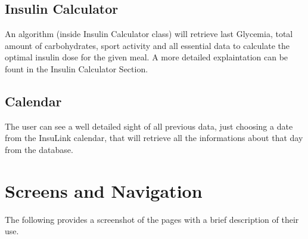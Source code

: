 \documentclass[12pt,hidelinks]{article}
\begin{document}
	\subsection{Insulin Calculator}
    An algorithm (inside Insulin Calculator class) will retrieve last Glycemia, total amount of carbohydrates, sport activity and all essential data
	to calculate the optimal insulin dose for the given meal. A more detailed explaintation can be fount in the Insulin Calculator Section.

	\subsection{Calendar}
	The user can see a well detailed sight of all previous data, just choosing a date from the InsuLink calendar, that will retrieve all the informations
	about that day from the database.
	
\newpage
\section{Screens and Navigation}
\vspace{10.5cm}
The following provides a screenshot of the pages with a brief description of their use.
\end{document}
